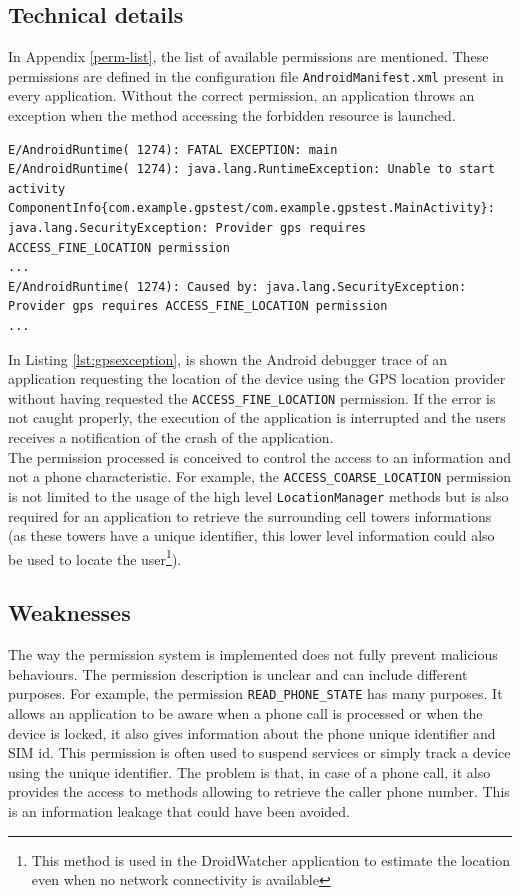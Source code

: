 \subsection{Technical details}
In Appendix \ref{perm-list}, the list of available permissions are mentioned.
These permissions are defined in the configuration file \texttt{AndroidManifest.xml} present in every application.
Without the correct permission, an application throws an exception when the method accessing the forbidden resource is launched.

\begin{lstlisting}[breaklines,caption={Example of permission violation log},label={lst:gpsexception},numbers=none]
E/AndroidRuntime( 1274): FATAL EXCEPTION: main
E/AndroidRuntime( 1274): java.lang.RuntimeException: Unable to start activity ComponentInfo{com.example.gpstest/com.example.gpstest.MainActivity}: java.lang.SecurityException: Provider gps requires ACCESS_FINE_LOCATION permission
...
E/AndroidRuntime( 1274): Caused by: java.lang.SecurityException: Provider gps requires ACCESS_FINE_LOCATION permission
...
\end{lstlisting}

In Listing \ref{lst:gpsexception}, is shown the Android debugger trace of an application requesting the location of the device using the GPS location provider without having requested the \texttt{ACCESS\_FINE\_LOCATION} permission.
If the error is not caught properly, the execution of the application is interrupted and the users receives a notification of the crash of the application.\\

The permission processed is conceived to control the access to an information and not a phone characteristic.
For example, the \texttt{ACCESS\_COARSE\_LOCATION} permission is not limited to the usage of the high level \texttt{LocationManager} methods but is also required for an application to retrieve the surrounding cell towers informations (as these towers have a unique identifier, this lower level information could also be used to locate the user\footnote{This method is used in the DroidWatcher application to estimate the location even when no network connectivity is available}).

\subsection{Weaknesses}

The way the permission system is implemented does not fully prevent malicious behaviours.
The permission description is unclear and can include different purposes.
For example, the permission \texttt{READ\_PHONE\_STATE} has many purposes.
It allows an application to be aware when a phone call is processed or when the device is locked, it also gives information about the phone unique identifier and SIM id.
This permission is often used to suspend services or simply track a device using the unique identifier.
The problem is that, in case of a phone call, it also provides the access to methods allowing to retrieve the caller phone number.
This is an information leakage that could have been avoided.\\

